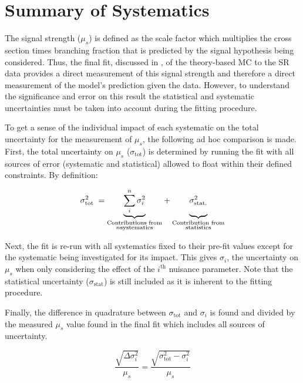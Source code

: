 \section{Summary of Systematics} \label{sec:systematics:summary}

The signal strength ($\mu_{s}$) is defined as the scale factor which multiplies
the cross section times branching fraction that is predicted by the signal
hypothesis being considered.  Thus, the final fit, discussed in
, of the theory-based MC to the SR data provides a direct
measurement of this signal strength and therefore a direct measurement of the
model's prediction given the data. However, to understand the significance and
error on this result the statistical and systematic uncertainties must be taken
into account during the fitting procedure.

To get a sense of the individual impact of each systematic on the total
uncertainty for the measurement of $\mu_{s}$, the following ad hoc comparison
is made.  First, the total uncertainty on $\mu_{s}$ ($\sigma_{\text{tot}}$) is
determined by running the fit with all sources of error (systematic and
statistical) allowed to float within their defined constraints.  By definition:

\begin{equation}
 \sigma_{\text{tot}}^{2} \; = {\underbrace{\sum_{i}^{n} \sigma_{i}^{2}}_{\substack{\text{Contributions from} \\ n \text{systematics}}}} + {\underbrace{\vphantom{\sum_{i}^{n}} \sigma_{\text{stat.}}^{2}}_{\substack{\text{Contribution from} \\ \text{statistics}}}}
\end{equation}

Next, the fit is re-run with all systematics fixed to their pre-fit values
except for the systematic being investigated for its impact. This gives
$\sigma_{i}$, the uncertainty on $\mu_{s}$ when only considering the effect of
the $i^{\text{th}}$ nuisance parameter. Note that the statistical uncertainty
($\sigma_{\text{stat}}$) is still included as it is inherent to the fitting
procedure.

Finally, the difference in quadrature between $\sigma_{\text{tot}}$ and
$\sigma_{i}$ is found and divided by the measured $\mu_{s}$ value found in the
final fit which includes all sources of uncertainty. 

\begin{equation} 
\frac{\sqrt{\Delta \sigma_i^2}}{\mu_{s}} = \frac{\sqrt{\sigma_{\text{tot}}^2 - \sigma_i^2}}{\mu_{s}}
\end{equation}

